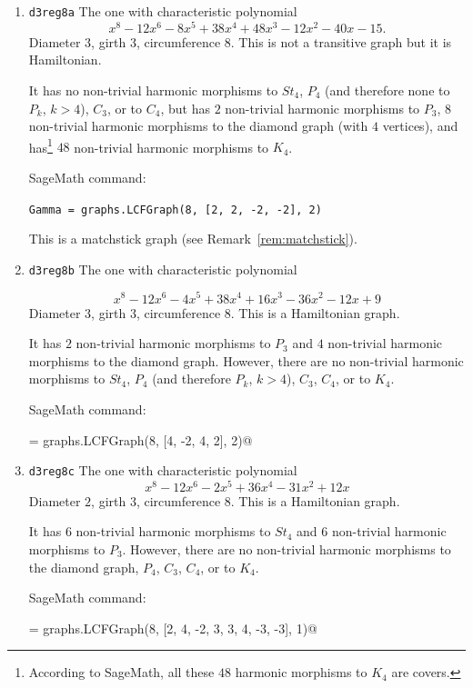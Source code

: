 \documentclass[12pt,letterpaper]{article}
\theoremstyle{definition}
\begin{document}
\begin{enumerate}
\item
  {\tt d3reg8a}\newline
  The one with characteristic polynomial  
\[
x^8 - 12x^6 - 8x^5 + 38x^4 + 48x^3 - 12x^2 - 40x - 15.
\]
Diameter $3$,
girth $3$,
circumference $8$.
This is not a transitive graph but it is Hamiltonian.

It has no non-trivial harmonic morphisms to $St_4$, $P_4$
(and therefore none to $P_k$, $k>4$),%
$C_3$, or to
$C_4$, but has $2$ non-trivial harmonic morphisms to $P_3$,
$8$ non-trivial harmonic morphisms to the
diamond graph (with $4$ vertices), and
has\footnote{According to SageMath, all these $48$ harmonic
  morphisms to $K_4$ are covers.}
$48$ non-trivial harmonic morphisms to $K_4$.

SageMath command:

\verb+Gamma = graphs.LCFGraph(8, [2, 2, -2, -2], 2)+

This is a matchstick graph (see Remark~\ref{rem:matchstick}).

\item
  {\tt  d3reg8b}\newline
The one with 
characteristic polynomial

\[
x^8 - 12x^6 - 4x^5 + 38x^4 + 16x^3 - 36x^2 - 12x + 9
\]
Diameter $3$,
girth $3$,
circumference $8$.
This is a Hamiltonian graph.

It has $2$ non-trivial harmonic morphisms to $P_3$ and
$4$ non-trivial harmonic morphisms to the diamond graph.
However, there are
no non-trivial harmonic morphisms to $St_4$, $P_4$
(and therefore $P_k$, $k>4$), $C_3$,
$C_4$, or to $K_4$.

SageMath command:

\verb@Gamma = graphs.LCFGraph(8, [4, -2, 4, 2], 2)@


\item
  {\tt d3reg8c}\newline
  The one with characteristic polynomial  
\[
x^8 - 12x^6 - 2x^5 + 36x^4 - 31x^2 + 12x
\]
Diameter $2$,
girth $3$,
circumference $8$.
This is a Hamiltonian graph.

It has $6$ non-trivial harmonic morphisms to $St_4$ and
$6$ non-trivial harmonic morphisms to $P_3$. However, there are
no non-trivial harmonic morphisms to the diamond graph, $P_4$,
$C_3$, $C_4$, or to $K_4$.

SageMath command:

\verb@Gamma = graphs.LCFGraph(8, [2, 4, -2, 3, 3, 4, -3, -3], 1)@



\end{enumerate}
\end{document}
